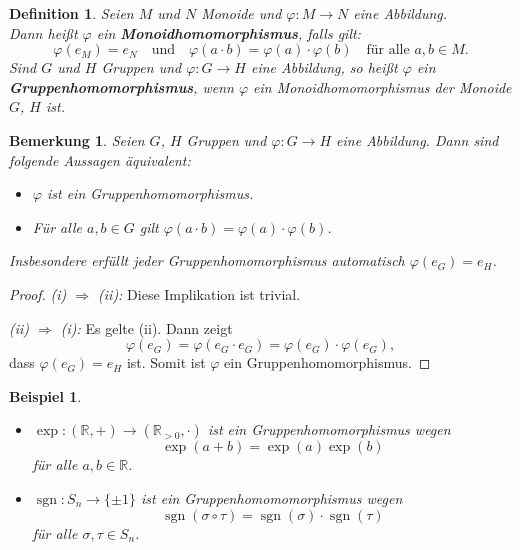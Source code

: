 \documentclass[a4paper, twoside, 11pt, ngerman]{report}
\DeclareMathOperator{\sgn}{sgn}
\theoremstyle{definistyle}
\newtheorem{defini}[satz]{Definition}
\newtheorem{bem}[satz]{Bemerkung}
\newtheorem{bsp}[satz]{Beispiel}
\theoremstyle{remark}
\newcommand{\defn}[1]{\textit{\bfseries #1}}
\begin{document}
\begin{defini}\label{def:monoidhom}
Seien $ M $ und $ N $ Monoide und $ \varphi: M \to N $ eine Abbildung.\\
Dann heißt $ \varphi $ ein \defn{Monoidhomomorphismus}, falls gilt:
\[
\varphi(e_M) = e_N \quad \text{und} \quad \varphi(a \cdot b) = \varphi(a) \cdot \varphi(b) \quad \text{für alle } a, b \in M.
\]
Sind $ G $ und $ H $ Gruppen und $ \varphi: G \to H $ eine Abbildung, so heißt $ \varphi $ ein \defn{Gruppenhomomorphismus}, wenn $\varphi$ ein Monoidhomomorphismus der Monoide $G$, $H$ ist.
\end{defini}


\begin{bem}\label{bem:gruppenhom_aequiv}
Seien $ G $, $ H $ Gruppen und $ \varphi: G \to H $ eine Abbildung. Dann sind folgende Aussagen äquivalent:
\begin{itemize}
    \item[(i)] $ \varphi $ ist ein Gruppenhomomorphismus.
    \item[(ii)] Für alle $ a, b \in G $ gilt $ \varphi(a \cdot b) = \varphi(a) \cdot \varphi(b) $.
\end{itemize}
Insbesondere erfüllt jeder Gruppenhomomorphismus automatisch $ \varphi(e_G) = e_H $.
\end{bem}

\begin{proof}
\textit{(i) $\Rightarrow$ (ii):} Diese Implikation ist trivial.

\textit{(ii) $\Rightarrow$ (i):} Es gelte (ii). Dann zeigt 
\[
\varphi(e_G) = \varphi(e_G \cdot e_G) = \varphi(e_G) \cdot \varphi(e_G),
\]
dass $\varphi(e_G) = e_H$ ist. Somit ist $ \varphi $ ein Gruppenhomomorphismus.
\end{proof}



\begin{bsp}\label{bsp:gruppenhom_beispiele}
\begin{itemize}
    \item[(a)] $ \exp: (\mathbb{R}, +) \to (\mathbb{R}_{>0}, \cdot) $ ist ein Gruppenhomomorphismus wegen \[\exp(a + b) = \exp(a) \exp(b) \] für alle $ a, b \in \mathbb{R} $.
    \item[(b)] $ \sgn: S_n \to \{ \pm 1 \} $ ist ein Gruppenhomomomorphismus wegen \[\sgn(\sigma \circ \tau) = \sgn(\sigma) \cdot \sgn(\tau) \] für alle $ \sigma, \tau \in S_n $.
\end{itemize}
\end{bsp}
\end{document}
